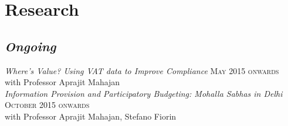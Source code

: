 \documentclass[11pt]{article}
\begin{document}
\section{Research}
\label{sec-2}
\subsection{\textbf{\emph{Ongoing}}}
\label{sec-2-1}
\flushleft
\emph{Where’s Value? Using VAT data to Improve Compliance} \hfill \textsc{\normalsize May 2015 onwards}\\
with Professor Aprajit Mahajan\\
\vspace{0.5em}
\emph{Information Provision and Participatory Budgeting: Mohalla Sabhas in Delhi} \hfill \textsc{\normalsize October 2015 onwards}\\
with Professor Aprajit Mahajan, Stefano Fiorin\\
\vspace{0.5em}
\end{document}
